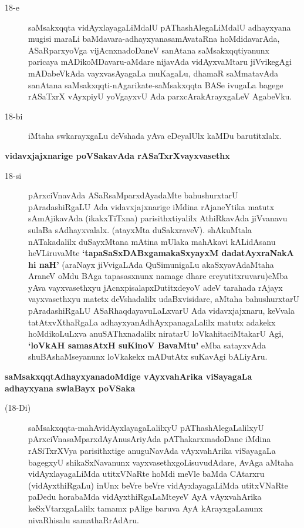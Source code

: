 \begin{description}
\item[18-e] saMsakxqqta vidAyxlayagaLiMdalU pAThashAlegaLiMdalU adhayxyana mugisi maraLi baMdavara-adhayx\-yana\-samAvataRna hoMdidavarAda, ASaR\break\-parxyoVga vijAcnxnadoDaneV sanAtana saMsakxqqti\-yanunx paricaya mADi\-koMDa\-varu-aMdare nijavAda vidAyxvaMtaru jiVvikegAgi mADabeVkAda vayxva\break\-sAyagaLa muKagaLu, dhamaR saMmatavAda sanAtana saMsakxqqti-nAgarikate\break-saMsakxqqta BASe ivu\-gaLa bagege rASaTxrX vAyxpiyU yoVgayxvU Ada parxcAra\-kArayxgaLeV AgabeVku.

\item[18-bi] iMtaha swkarayxgaLu deVshada yAva eDeyalUlx kaMDu barutitxlalx.
\end{description}
\noindent
{\large\bf vidavxjajxnarige poVSakavAda rASaTxrXvayxvasethx}\label{page46a}
\begin{description}
\item[18-si] pArxciVnavAda ASaRsaMparxdAyadaMte bahushurxtarU pAradashiRgaLU Ada vidavxjajxnarige iMdina\- rAjaneYtika matutx sAmAjikavAda (ikakxTiTxna) parisithxti\-yalilx AthiRkavAda jiVvanavu sulaBa sAdhayx\-valalx. (atayxMta duSakxraveV). shAkuMtala nATakadalilx duSayxMtana mAtina mUlaka mahAkavi kALi\-dAsanu heVLiruvaMte {\bf `tapaSaSxDABxgamakaSxyayxM\label{46} dadatAyxraNakA hi naH'} (araNayx jiVvi\-gaLAda QuSi\-muni\-gaLu akaSxyavAdaMtaha AraneV oMdu BAga tapasasxnunx namage dhare ereyutitxruvaru)eMba yAva vayxvasethxyu jAcnxpisalapxDutitxdeyoV adeV tarahada rAjayx vayxvasethxyu matetx deVshadalilx udaBxvisidare, aMtaha bahushurxtarU pAradashiRgaLU ASaRhaqdayavuLaLxvarU Ada vidavxjajxnaru, keVvala tatAtxvX\-thaRgaLa adhayxyanAdhAyxpanagaLalilx matutx adakekx hoMdikoLuLxva anuSAThxnadalilx niratarU loVkahita\-ciMtakarU Agi, {\bf `loVkAH samasAtxH suKinoV BavaMtu'\label{47}} eMba satayxvAda shuBAshaMseyanunx loVkakekx mADutAtx suKavAgi bALiyAru.
\end{description}
{\noindent
{\large\bf saMsakxqqtAdhayxyanadoMdige vAyxvahArika viSayagaLa adhayxyana swlaBayx poVSaka}}\label{page47}
\begin{description}
\item[(18-Di)] saMsakxqqta-mahAvidAyxlayagaLalilxyU pAThashAlegaLalilxyU pArxciVna\break saMparxdAyAnu\-sAri\-yAda pAThakarxmadoDane iMdina rASiTxrXVya pari\-sithxtige anuguNavAda vAyxvahArika viSayagaLa bagegxyU shikaSxNavanunx vayxvasethxgoLisuvudAdare, AvAga aMtaha vidAyxlayagaLiMda utitxVNaRte hoMdi meVle baMda CAtarxru (vidAyxthiRgaLu) inUnx beVre beVre vidAyxlayagaLiMda utitxVNaRte paDedu hora\-baMda vidAyxthiRgaLaMteyeV AyA vAyxvahArika keSxVtarxgaLalilx tamamx pAlige baruva AyA kArayxgaLanunx nivaR\-hisalu samathaRrAdAru.
\end{description}
